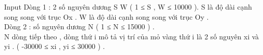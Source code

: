 Input
Dòng 1 : 2 số nguyên dương S W ( 1 ≤ S , W ≤ 10000 ). S là độ dài cạnh song song với trục Ox . W là độ dài cạnh song song với trục Oy .   
\\   Dòng 2 : số nguyên dương N ( 1 ≤ N ≤ 15000 ) .   
\\   N dòng tiếp theo , dòng thứ i mô tả vị trí của mỏ vàng thứ i là 2 số nguyên xi và yi . ( -30000 ≤ xi , yi ≤ 30000 ) .